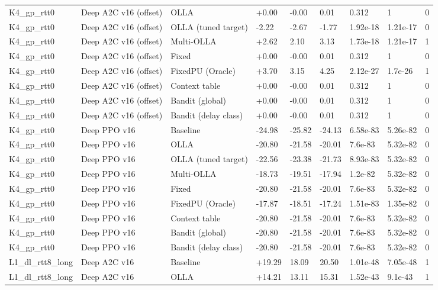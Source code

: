 \documentclass[10pt]{article}
\begin{document}
\begin{landscape}
\begin{longtable}{@{}lllllllll@{}}
K4\_gp\_rtt0 & Deep A2C v16 (offset) & OLLA & +0.00 & -0.00 & 0.01 & 0.312 & 1 & 0 \\
K4\_gp\_rtt0 & Deep A2C v16 (offset) & OLLA (tuned target) & -2.22 & -2.67 & -1.77 & 1.92e-18 & 1.21e-17 & 0 \\
K4\_gp\_rtt0 & Deep A2C v16 (offset) & Multi-OLLA & +2.62 & 2.10 & 3.13 & 1.73e-18 & 1.21e-17 & 1 \\
K4\_gp\_rtt0 & Deep A2C v16 (offset) & Fixed & +0.00 & -0.00 & 0.01 & 0.312 & 1 & 0 \\
K4\_gp\_rtt0 & Deep A2C v16 (offset) & FixedPU (Oracle) & +3.70 & 3.15 & 4.25 & 2.12e-27 & 1.7e-26 & 1 \\
K4\_gp\_rtt0 & Deep A2C v16 (offset) & Context table & +0.00 & -0.00 & 0.01 & 0.312 & 1 & 0 \\
K4\_gp\_rtt0 & Deep A2C v16 (offset) & Bandit (global) & +0.00 & -0.00 & 0.01 & 0.312 & 1 & 0 \\
K4\_gp\_rtt0 & Deep A2C v16 (offset) & Bandit (delay class) & +0.00 & -0.00 & 0.01 & 0.312 & 1 & 0 \\
K4\_gp\_rtt0 & Deep PPO v16 & Baseline & -24.98 & -25.82 & -24.13 & 6.58e-83 & 5.26e-82 & 0 \\
K4\_gp\_rtt0 & Deep PPO v16 & OLLA & -20.80 & -21.58 & -20.01 & 7.6e-83 & 5.32e-82 & 0 \\
K4\_gp\_rtt0 & Deep PPO v16 & OLLA (tuned target) & -22.56 & -23.38 & -21.73 & 8.93e-83 & 5.32e-82 & 0 \\
K4\_gp\_rtt0 & Deep PPO v16 & Multi-OLLA & -18.73 & -19.51 & -17.94 & 1.2e-82 & 5.32e-82 & 0 \\
K4\_gp\_rtt0 & Deep PPO v16 & Fixed & -20.80 & -21.58 & -20.01 & 7.6e-83 & 5.32e-82 & 0 \\
K4\_gp\_rtt0 & Deep PPO v16 & FixedPU (Oracle) & -17.87 & -18.51 & -17.24 & 1.51e-83 & 1.35e-82 & 0 \\
K4\_gp\_rtt0 & Deep PPO v16 & Context table & -20.80 & -21.58 & -20.01 & 7.6e-83 & 5.32e-82 & 0 \\
K4\_gp\_rtt0 & Deep PPO v16 & Bandit (global) & -20.80 & -21.58 & -20.01 & 7.6e-83 & 5.32e-82 & 0 \\
K4\_gp\_rtt0 & Deep PPO v16 & Bandit (delay class) & -20.80 & -21.58 & -20.01 & 7.6e-83 & 5.32e-82 & 0 \\
L1\_dl\_rtt8\_long & Deep A2C v16 & Baseline & +19.29 & 18.09 & 20.50 & 1.01e-48 & 7.05e-48 & 1 \\
L1\_dl\_rtt8\_long & Deep A2C v16 & OLLA & +14.21 & 13.11 & 15.31 & 1.52e-43 & 9.1e-43 & 1 \\

\end{longtable}
\end{landscape}
\end{document}
